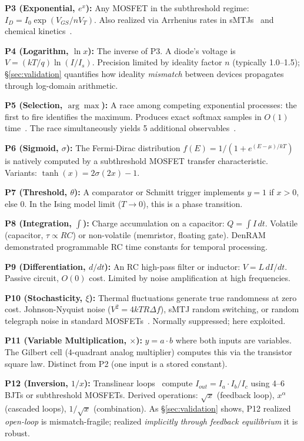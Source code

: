 \documentclass[11pt]{article}
\begin{document}
\textbf{P3 (Exponential, $e^x$):} Any MOSFET in the subthreshold regime: $I_D = I_0 \exp(V_{GS}/nV_T)$. Also realized via Arrhenius rates in sMTJs~\cite{bieg2025} and chemical kinetics~\cite{bieg2026}.

\textbf{P4 (Logarithm, $\ln x$):} The inverse of P3. A diode's voltage is $V = (kT/q)\ln(I/I_s)$. Precision limited by ideality factor $n$ (typically 1.0--1.5); \S\ref{sec:validation} quantifies how ideality \textit{mismatch} between devices propagates through log-domain arithmetic.

\textbf{P5 (Selection, $\arg\max$):} A race among competing exponential processes: the first to fire identifies the maximum. Produces exact softmax samples in $O(1)$ time~\cite{bieg2025}. The race simultaneously yields 5 additional observables~\cite{bieg2026}.

\textbf{P6 (Sigmoid, $\sigma$):} The Fermi-Dirac distribution $f(E) = 1/(1 + e^{(E-\mu)/kT})$ is natively computed by a subthreshold MOSFET transfer characteristic. Variants: $\tanh(x) = 2\sigma(2x) - 1$.

\textbf{P7 (Threshold, $\theta$):} A comparator or Schmitt trigger implements $y = 1$ if $x > 0$, else $0$. In the Ising model limit ($T \to 0$), this is a phase transition.

\textbf{P8 (Integration, $\int$):} Charge accumulation on a capacitor: $Q = \int I\,dt$. Volatile (capacitor, $\tau \propto RC$) or non-volatile (memristor, floating gate). DenRAM~\cite{denram2024} demonstrated programmable RC time constants for temporal processing.

\textbf{P9 (Differentiation, $d/dt$):} An RC high-pass filter or inductor: $V = L\,dI/dt$. Passive circuit, $O(0)$ cost. Limited by noise amplification at high frequencies.

\textbf{P10 (Stochasticity, $\xi$):} Thermal fluctuations generate true randomness at zero cost. Johnson-Nyquist noise ($V^2 = 4kTR\Delta f$), sMTJ random switching, or random telegraph noise in standard MOSFETs~\cite{cryptoristor2024}. Normally suppressed; here exploited.

\textbf{P11 (Variable Multiplication, $\times$):} $y = a \cdot b$ where both inputs are variables. The Gilbert cell (4-quadrant analog multiplier) computes this via the transistor square law. Distinct from P2 (one input is a stored constant).

\textbf{P12 (Inversion, $1/x$):} Translinear loops~\cite{gilbert1975} compute $I_{out} = I_a \cdot I_b / I_c$ using 4--6 BJTs or subthreshold MOSFETs. Derived operations: $\sqrt{x}$ (feedback loop), $x^\alpha$ (cascaded loops), $1/\sqrt{x}$ (combination). As \S\ref{sec:validation} shows, P12 realized \textit{open-loop} is mismatch-fragile; realized \textit{implicitly through feedback equilibrium} it is robust.
\end{document}

